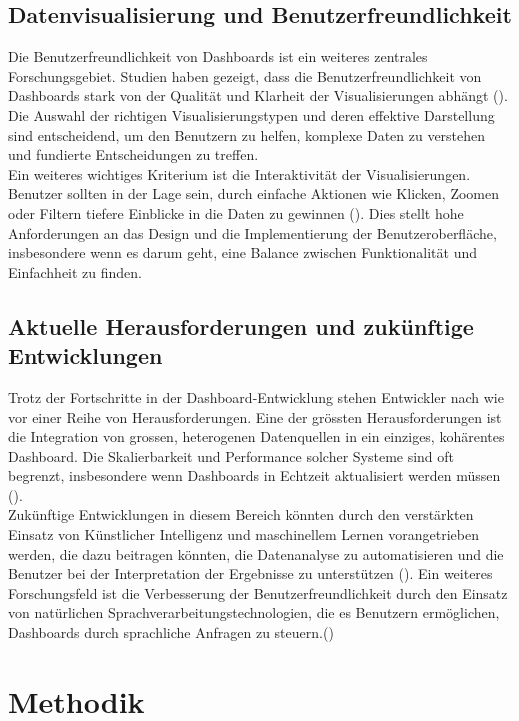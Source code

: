 \documentclass[a4paper, 12pt]{scrartcl}
\begin{document}
\subsection{Datenvisualisierung und Benutzerfreundlichkeit}
Die Benutzerfreundlichkeit von Dashboards ist ein weiteres zentrales Forschungsgebiet. Studien haben gezeigt, dass die Benutzerfreundlichkeit von Dashboards stark von der Qualität und Klarheit der Visualisierungen abhängt (\cite{HYNEK2015}). Die Auswahl der richtigen Visualisierungstypen und deren effektive Darstellung sind entscheidend, um den Benutzern zu helfen, komplexe Daten zu verstehen und fundierte Entscheidungen zu treffen.\\[1em]Ein weiteres wichtiges Kriterium ist die Interaktivität der Visualisierungen. Benutzer sollten in der Lage sein, durch einfache Aktionen wie Klicken, Zoomen oder Filtern tiefere Einblicke in die Daten zu gewinnen (\cite{Alhamadi2020}). Dies stellt hohe Anforderungen an das Design und die Implementierung der Benutzeroberfläche, insbesondere wenn es darum geht, eine Balance zwischen Funktionalität und Einfachheit zu finden.

\subsection{Aktuelle Herausforderungen und zukünftige Entwicklungen}
Trotz der Fortschritte in der Dashboard-Entwicklung stehen Entwickler nach wie vor einer Reihe von Herausforderungen. Eine der grössten Herausforderungen ist die Integration von grossen, heterogenen Datenquellen in ein einziges, kohärentes Dashboard. Die Skalierbarkeit und Performance solcher Systeme sind oft begrenzt, insbesondere wenn Dashboards in Echtzeit aktualisiert werden müssen (\cite{MartinezOrtiz2019}).\\[1em]Zukünftige Entwicklungen in diesem Bereich könnten durch den verstärkten Einsatz von Künstlicher Intelligenz und maschinellem Lernen vorangetrieben werden, die dazu beitragen könnten, die Datenanalyse zu automatisieren und die Benutzer bei der Interpretation der Ergebnisse zu unterstützen (\cite{Mukhopadhyay2019}). Ein weiteres Forschungsfeld ist die Verbesserung der Benutzerfreundlichkeit durch den Einsatz von natürlichen Sprachverarbeitungstechnologien, die es Benutzern ermöglichen, Dashboards durch sprachliche Anfragen zu steuern.(\cite{Kumar2021})
\clearpage
	\section{Methodik}
	\label{sec:standDerForschung}
\end{document}
